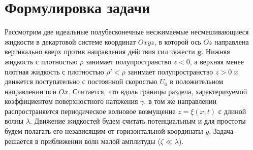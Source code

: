 \section{Формулировка задачи}\label{sec:ProcSnos}

Рассмотрим две идеальные полубесконечные несжимаемые несмешивающиеся жидкости в декартовой системе координат $ Oxyz $, в которой ось $ Oz $ направлена вертикально вверх против направления действия сил тяжести $ \mathbf{g} $. Нижняя жидкость с плотностью $ \rho $ занимает полупространство $ z<0 $, а верхняя менее плотная жидкость с плотностью $ \rho' < \rho $ занимает полупространство $ z>0 $ и движется поступательно с постоянной скоростью $ U_{0} $ в положительном направлении оси $ Ox $. Считается, что вдоль границы раздела, характеризуемой коэффициентом поверхностного натяжения $ \gamma $, в том же направлении распространяется периодическое волновое возмущение $ z=\xi \left(x, t\right) $ с длиной волны $ \lambda $. Движение жидкостей будем считать потенциальным и для простоты будем полагать его независящим от горизонтальной координаты $ y $. Задача решается в приближении волн малой амплитуды ($ \zeta \ll \lambda $). 
 
